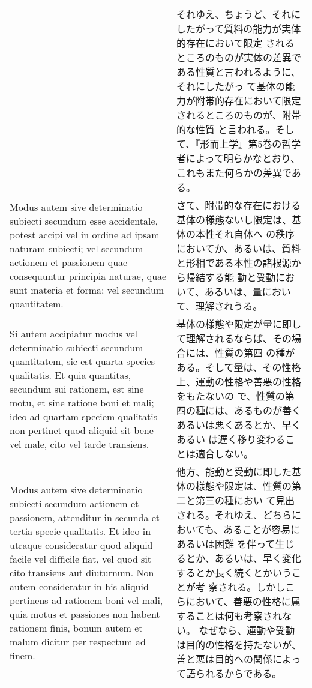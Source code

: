 \documentclass[10pt]{jsarticle} %
\begin{document}
\begin{longtable}{p{21em}p{21em}}
&

それゆえ、ちょうど、それにしたがって質料の能力が実体的存在において限定
されるところのものが実体の差異である性質と言われるように、それにしたがっ
て基体の能力が附帯的存在において限定されるところのものが、附帯的な性質
と言われる。そして、『形而上学』第5巻の哲学者によって明らかなとおり、
これもまた何らかの差異である。


\\



Modus autem sive
determinatio subiecti secundum esse accidentale, potest accipi vel in
ordine ad ipsam naturam subiecti; vel secundum actionem et passionem
quae consequuntur principia naturae, quae sunt materia et forma; vel
secundum quantitatem. 


&

さて、附帯的な存在における基体の様態ないし限定は、基体の本性それ自体へ
の秩序においてか、あるいは、質料と形相である本性の諸根源から帰結する能
動と受動において、あるいは、量において、理解されうる。


\\



Si autem accipiatur modus vel determinatio
subiecti secundum quantitatem, sic est quarta species qualitatis. Et
quia quantitas, secundum sui rationem, est sine motu, et sine ratione
boni et mali; ideo ad quartam speciem qualitatis non pertinet quod
aliquid sit bene vel male, cito vel tarde transiens. 



&


基体の様態や限定が量に即して理解されるならば、その場合には、性質の第四
の種がある。そして量は、その性格上、運動の性格や善悪の性格をもたないの
で、性質の第四の種には、あるものが善くあるいは悪くあるとか、早くあるい
は遅く移り変わることは適合しない。


\\


Modus autem sive
determinatio subiecti secundum actionem et passionem, attenditur in
secunda et tertia specie qualitatis. Et ideo in utraque consideratur
quod aliquid facile vel difficile fiat, vel quod sit cito transiens
aut diuturnum. Non autem consideratur in his aliquid pertinens ad
rationem boni vel mali, quia motus et passiones non habent rationem
finis, bonum autem et malum dicitur per respectum ad finem. 


&

他方、能動と受動に即した基体の様態や限定は、性質の第二と第三の種におい
て見出される。それゆえ、どちらにおいても、あることが容易にあるいは困難
を伴って生じるとか、あるいは、早く変化するとか長く続くとかいうことが考
察される。しかしこらにおいて、善悪の性格に属することは何も考察されない。
なぜなら、運動や受動は目的の性格を持たないが、善と悪は目的への関係によっ
て語られるからである。



\end{longtable}
\end{document}
